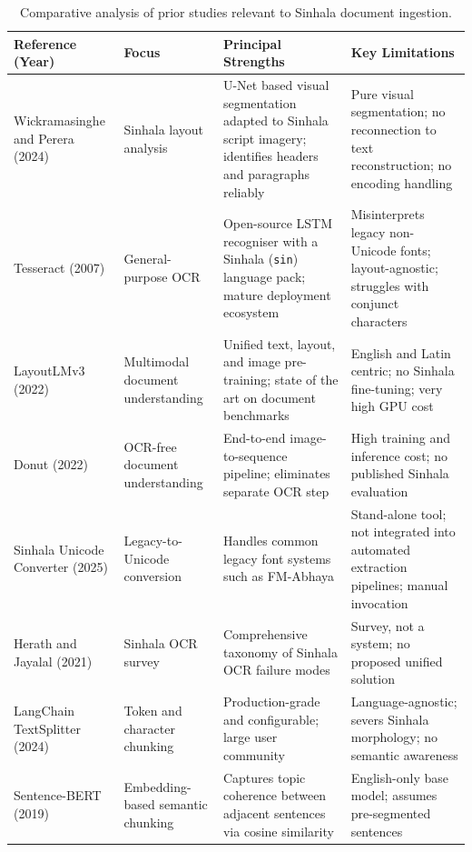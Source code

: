 \documentclass[12pt,a4paper,oneside]{report}
\begin{document}
\begin{table}[h]
\centering
\caption{Comparative analysis of prior studies relevant to Sinhala document ingestion.}
\label{tab:lit-comparison}
\renewcommand{\arraystretch}{1.25}
\footnotesize
\begin{tabularx}{\textwidth}{p{3.3cm} p{2.8cm} X X}
\hline
\textbf{Reference (Year)} & \textbf{Focus} & \textbf{Principal Strengths} & \textbf{Key Limitations} \\
\hline
Wickramasinghe and Perera \cite{wickramasinghe2024unet} (2024) & Sinhala layout analysis & U-Net based visual segmentation adapted to Sinhala script imagery; identifies headers and paragraphs reliably & Pure visual segmentation; no reconnection to text reconstruction; no encoding handling \\
\hline
Tesseract \cite{smith2007tesseract} (2007) & General-purpose OCR & Open-source LSTM recogniser with a Sinhala (\texttt{sin}) language pack; mature deployment ecosystem & Misinterprets legacy non-Unicode fonts; layout-agnostic; struggles with conjunct characters \\
\hline
LayoutLMv3 \cite{huang2022layoutlmv3} (2022) & Multimodal document understanding & Unified text, layout, and image pre-training; state of the art on document benchmarks & English and Latin centric; no Sinhala fine-tuning; very high GPU cost \\
\hline
Donut \cite{kim2022donut} (2022) & OCR-free document understanding & End-to-end image-to-sequence pipeline; eliminates separate OCR step & High training and inference cost; no published Sinhala evaluation \\
\hline
Sinhala Unicode Converter \cite{webapps2025converter} (2025) & Legacy-to-Unicode conversion & Handles common legacy font systems such as FM-Abhaya & Stand-alone tool; not integrated into automated extraction pipelines; manual invocation \\
\hline
Herath and Jayalal \cite{herath2021sinhala} (2021) & Sinhala OCR survey & Comprehensive taxonomy of Sinhala OCR failure modes & Survey, not a system; no proposed unified solution \\
\hline
LangChain TextSplitter \cite{langchain2024} (2024) & Token and character chunking & Production-grade and configurable; large user community & Language-agnostic; severs Sinhala morphology; no semantic awareness \\
\hline
Sentence-BERT \cite{reimers2019sbert} (2019) & Embedding-based semantic chunking & Captures topic coherence between adjacent sentences via cosine similarity & English-only base model; assumes pre-segmented sentences \\

\end{tabularx}
\end{table}
\end{document}
